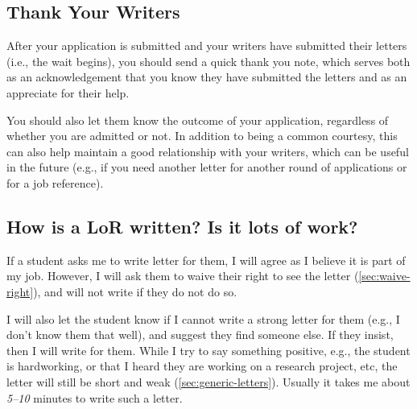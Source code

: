 \documentclass[oneside,11pt,dvipsnames]{book}
\newenvironment{commentbox}[1][]{
  \small
  \begin{mybox}
    {\small \textbf{#1}}
  }{
  \end{mybox}
}
\begin{document}
\subsection{Thank Your Writers}\label{sec:thank-writers}
After your application is submitted and your writers have submitted their letters (i.e., the wait begins), you should send a quick thank you note, which serves both as an acknowledgement that you know they have submitted the letters and as an appreciate for their help.  

You should also let them know the outcome of your application, regardless of whether you are admitted or not.  In addition to being a common courtesy, this can also help maintain a good relationship with your writers, which can be useful in the future (e.g., if you need another letter for another round of applications or for a job reference).




\subsection{How is a LoR written? Is it lots of work?}\label{sec:lor-writing}

If a student asks me to write letter for them, I will agree as I believe it is part of my job. However, I will ask them to waive their right to see the letter (\autoref{sec:waive-right}), and will not write if they do not do so.

I will also let the student know if I cannot write a strong letter for them (e.g., I don't know them that well), and suggest they find someone else.  If they insist, then I will write for them. While I try to say something positive, e.g., the student is hardworking, or that I heard they are working on a research project, etc, the letter will still be short and weak (\autoref{sec:generic-letters}). Usually it takes me about \emph{5--10} minutes to write such a letter.
\end{document}
